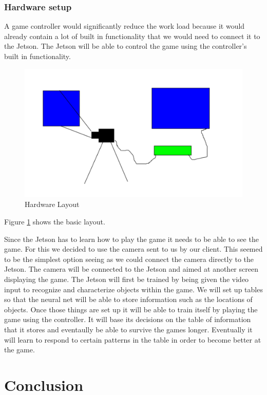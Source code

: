 \documentclass{scrreprt}
\begin{document}
\subsection{Hardware setup}%

A game controller would significantly reduce the work load because it would already contain a lot of built in functionality that we would need to connect it to the Jetson.
The Jetson will be able to control the game using the controller's built in functionality.

\begin{figure}
  \includegraphics[natwidth=50,natheight=100]{design.PNG}
  \caption{Hardware Layout}
  \label{fig:design1}
\end{figure}
Figure \ref{fig:design1} shows the basic layout.

Since the Jetson has to learn how to play the game it needs to be able to see the game.
For this we decided to use the camera sent to us by our client.
This seemed to be the simplest option seeing as we could connect the camera directly to the Jetson.
The camera will be connected to the Jetson and aimed at another screen displaying the game.
The Jetson will first be trained by being given the video input to recognize and characterize objects within the game.
We will set up tables so that the neural net will be able to store information such as the locations of objects.
Once those things are set up it will be able to train itself by playing the game using the controller.
It will base its decisions on the table of information that it stores and eventaully be able to survive the games longer.
Eventually it will learn to respond to certain patterns in the table in order to become better at the game.

\chapter{Conclusion}
\end{document}
